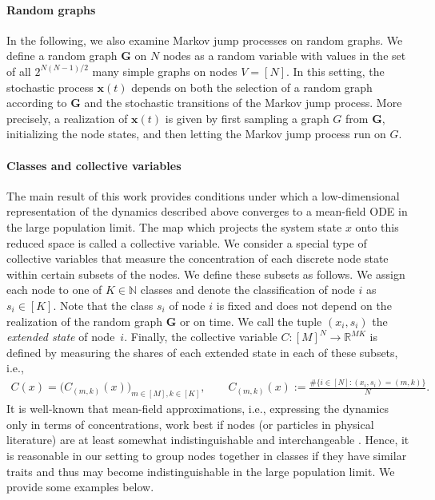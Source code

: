 \documentclass[a4paper,
               10pt,
               pdftex,
               normalheadings,
               headsepline,
               footsepline,
               headinclude,
               footinclude,
               DIV=14,
               abstracton]
{scrartcl}
\newcommand{\R}{\mathbb{R}}
\newcommand{\rv}[1]{\bm{#1}}
\begin{document}
\paragraph{Random graphs}
In the following, we also examine Markov jump processes on random graphs.
We define a random graph $\rv{G}$ on $N$ nodes as a random variable with values in the set of all $2^{N(N-1)/2}$ many simple graphs on nodes $V = [N]$.
In this setting, the stochastic process $\rv{x}(t)$ depends on both the selection of a random graph according to $\rv{G}$ and the stochastic transitions of the Markov jump process.
More precisely, a realization of $\rv{x}(t)$ is given by first sampling a graph $G$ from $\rv{G}$, initializing the node states, and then letting the Markov jump process run on $G$.

\paragraph{Classes and collective variables}
The main result of this work provides conditions under which a low-dimensional representation of the dynamics described above converges to a mean-field ODE in the large population limit.
The map which projects the system state $x$ onto this reduced space is called a collective variable.
We consider a special type of collective variables that measure the concentration of each discrete node state within certain subsets of the nodes. We define these subsets as follows.
We assign each node to one of $K \in \mathbb{N}$ classes and denote the classification of node $i$ as $s_i \in [K]$. Note that the class $s_i$ of node $i$ is fixed and does not depend on the realization of the random graph $\rv{G}$ or on time.
We call the tuple $(x_i, s_i)$ the \textit{extended state} of node~$i$.
Finally, the collective variable $C:[M]^N \to \R^{MK}$ is defined by measuring the shares of each extended state in each of these subsets, i.e.,
\begin{align} \label{eq:C}
    C(x) = \Big(C_{(m, k)}(x)\Big)_{m \in [M], k \in [K]} , \qquad C_{(m, k)}(x) := \frac{\# \{i \in [N]: (x_i, s_i) = (m, k) \}}{N}.
\end{align}
It is well-known that mean-field approximations, i.e., expressing the dynamics only in terms of concentrations, work best if nodes (or particles in physical literature) are at least somewhat indistinguishable and interchangeable \cite{Porter2016,Ayi2020}. Hence, it is reasonable in our setting to group nodes together in classes if they have similar traits and thus may become indistinguishable in the large population limit. We provide some examples below.
\end{document}
